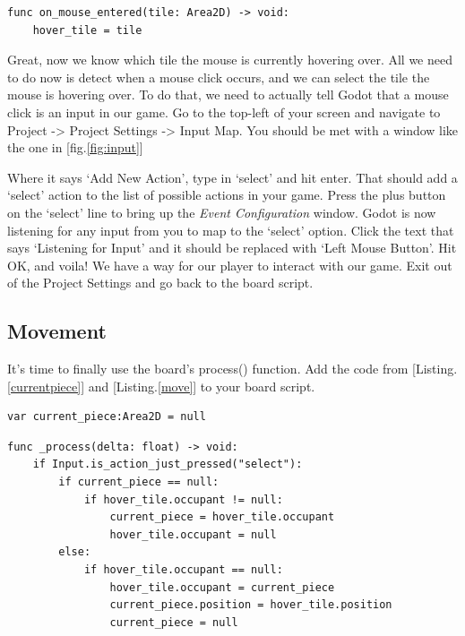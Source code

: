 \documentclass[14pt]{extarticle}
\newcommand{\prettyref}[2]{[{#1}.\ref{#2}]}
\begin{document}
\begin{lstlisting}[language=gdscript, label={mouse}, caption=The receiving function]
func on_mouse_entered(tile: Area2D) -> void:
	hover_tile = tile
\end{lstlisting}

Great, now we know which tile the mouse is currently hovering over. All we need to do now is detect when a mouse click occurs, and we can select the tile the mouse is hovering over. To do that, we need to actually tell Godot that a mouse click is an input in our game. Go to the top-left of your screen and navigate to Project -> Project Settings -> Input Map. You should be met with a window like the one in \prettyref{fig}{fig:input}


Where it says `Add New Action', type in `select' and hit enter. That should add a `select' action to the list of possible actions in your game. Press the plus button on the `select' line to bring up the \textit{Event Configuration} window. Godot is now listening for any input from you to map to the `select' option. Click the text that says `Listening for Input' and it should be replaced with `Left Mouse Button'. Hit OK, and voila! We have a way for our player to interact with our game. Exit out of the Project Settings and go back to the board script.

\subsection*{Movement}
It's time to finally use the board's process() function. Add the code from \prettyref{Listing}{currentpiece} and \prettyref{Listing}{move} to your board script.

\begin{lstlisting}[language=gdscript, label={currentpiece}, caption=A new variable]
var current_piece:Area2D = null
\end{lstlisting}

\begin{lstlisting}[language=gdscript, label={move}, caption=Piece moving code]
func _process(delta: float) -> void:
	if Input.is_action_just_pressed("select"):
		if current_piece == null:
			if hover_tile.occupant != null:
				current_piece = hover_tile.occupant
				hover_tile.occupant = null
		else:
			if hover_tile.occupant == null:
				hover_tile.occupant = current_piece
				current_piece.position = hover_tile.position
				current_piece = null
\end{lstlisting}
\end{document}
